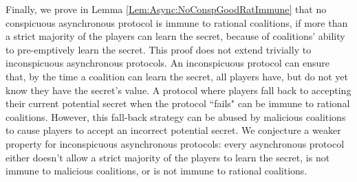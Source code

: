 \documentclass{dalcsthesis}
\begin{document}
Finally, we prove in Lemma \ref{Lem:Async:NoConspGoodRatImmune} that no conspicuous asynchronous protocol is immune to rational coalitions, if more than a strict majority of the players can learn the secret, because of coalitions' ability to pre-emptively learn the secret. This proof does not extend trivially to inconspicuous asynchronous protocols. An inconspicuous protocol can ensure that, by the time a coalition can learn the secret, all players have, but do not yet know they have the secret's value. A protocol where players fall back to accepting their current potential secret when the protocol ``fails" can be immune to rational coalitions. However, this fall-back strategy can be abused by malicious coalitions to cause players to accept an incorrect potential secret. We conjecture a weaker property for inconspicuous asynchronous protocols: every asynchronous protocol either doesn't allow a strict majority of the players to learn the secret, is not immune to malicious coalitions, or is not immune to rational coalitions.
\end{document}
